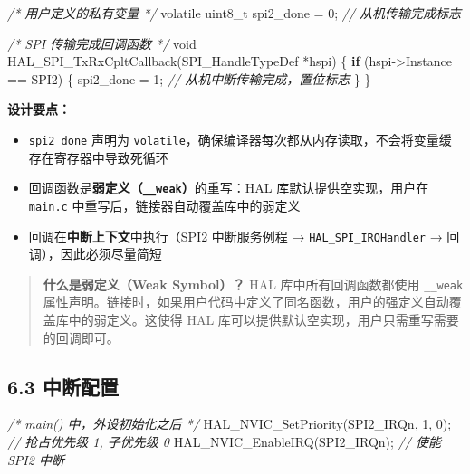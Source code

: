 \documentclass[
  chinese,
  UTF8,
  oneside,
  openany]{ctexbook}
\newenvironment{Shaded}{}{}
\newcommand{\CommentTok}[1]{\textcolor[rgb]{0.38,0.63,0.69}{\textit{#1}}}
\newcommand{\ControlFlowTok}[1]{\textcolor[rgb]{0.00,0.44,0.13}{\textbf{#1}}}
\newcommand{\DataTypeTok}[1]{\textcolor[rgb]{0.56,0.13,0.00}{#1}}
\newcommand{\DecValTok}[1]{\textcolor[rgb]{0.25,0.63,0.44}{#1}}
\newcommand{\NormalTok}[1]{#1}
\newcommand{\OperatorTok}[1]{\textcolor[rgb]{0.40,0.40,0.40}{#1}}
\providecommand{\tightlist}{%
  \setlength{\itemsep}{0pt}\setlength{\parskip}{0pt}}
\begin{document}
\begin{Shaded}
\begin{Highlighting}[]
\CommentTok{/* 用户定义的私有变量 */}
\DataTypeTok{volatile} \DataTypeTok{uint8\_t}\NormalTok{ spi2\_done }\OperatorTok{=} \DecValTok{0}\OperatorTok{;}  \CommentTok{// 从机传输完成标志}

\CommentTok{/* SPI 传输完成回调函数 */}
\DataTypeTok{void}\NormalTok{ HAL\_SPI\_TxRxCpltCallback}\OperatorTok{(}\NormalTok{SPI\_HandleTypeDef }\OperatorTok{*}\NormalTok{hspi}\OperatorTok{)}
\OperatorTok{\{}
  \ControlFlowTok{if} \OperatorTok{(}\NormalTok{hspi}\OperatorTok{{-}\textgreater{}}\NormalTok{Instance }\OperatorTok{==}\NormalTok{ SPI2}\OperatorTok{)} \OperatorTok{\{}
\NormalTok{    spi2\_done }\OperatorTok{=} \DecValTok{1}\OperatorTok{;}  \CommentTok{// 从机中断传输完成，置位标志}
  \OperatorTok{\}}
\OperatorTok{\}}
\end{Highlighting}
\end{Shaded}

\textbf{设计要点：}

\begin{itemize}
\tightlist
\item
  \texttt{spi2\_done} 声明为
  \texttt{volatile}，确保编译器每次都从内存读取，不会将变量缓存在寄存器中导致死循环
\item
  回调函数是\textbf{弱定义（\texttt{\_\_weak}）}的重写：HAL
  库默认提供空实现，用户在 \texttt{main.c}
  中重写后，链接器自动覆盖库中的弱定义
\item
  回调在\textbf{中断上下文}中执行（SPI2 中断服务例程 →
  \texttt{HAL\_SPI\_IRQHandler} → 回调），因此必须尽量简短
\end{itemize}

\begin{quote}
\textbf{什么是弱定义（Weak Symbol）？} HAL 库中所有回调函数都使用
\texttt{\_\_weak}
属性声明。链接时，如果用户代码中定义了同名函数，用户的强定义自动覆盖库中的弱定义。这使得
HAL 库可以提供默认空实现，用户只需重写需要的回调即可。
\end{quote}

\subsection{6.3 中断配置}\label{ux4e2dux65adux914dux7f6e}

\begin{Shaded}
\begin{Highlighting}[]
\CommentTok{/* main() 中，外设初始化之后 */}
\NormalTok{HAL\_NVIC\_SetPriority}\OperatorTok{(}\NormalTok{SPI2\_IRQn}\OperatorTok{,} \DecValTok{1}\OperatorTok{,} \DecValTok{0}\OperatorTok{);}   \CommentTok{// 抢占优先级 1, 子优先级 0}
\NormalTok{HAL\_NVIC\_EnableIRQ}\OperatorTok{(}\NormalTok{SPI2\_IRQn}\OperatorTok{);}           \CommentTok{// 使能 SPI2 中断}
\end{Highlighting}
\end{Shaded}
\end{document}
